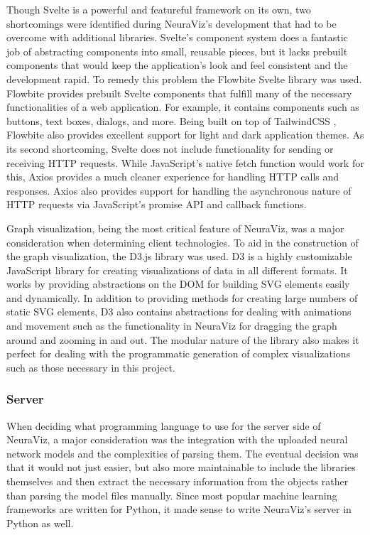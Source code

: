 Though Svelte is a powerful and featureful framework on its own, two shortcomings were identified during NeuraViz's development that had to be overcome with additional libraries. Svelte's component system does a fantastic job of abstracting components into small, reusable pieces, but it lacks prebuilt components that would keep the application's look and feel consistent and the development rapid. To remedy this problem the Flowbite Svelte library \cite{flowbite} was used. Flowbite provides prebuilt Svelte components that fulfill many of the necessary functionalities of a web application. For example, it contains components such as buttons, text boxes, dialogs, and more. Being built on top of TailwindCSS \cite{tailwind}, Flowbite also provides excellent support for light and dark application themes. As its second shortcoming, Svelte does not include functionality for sending or receiving HTTP requests. While JavaScript's native fetch function would work for this, Axios \cite{axios} provides a much cleaner experience for handling HTTP calls and responses. Axios also provides support for handling the asynchronous nature of HTTP requests via JavaScript's promise API and callback functions.

Graph visualization, being the most critical feature of NeuraViz, was a major consideration when determining client technologies. To aid in the construction of the graph visualization, the D3.js library \cite{d3} was used. D3 is a highly customizable JavaScript library for creating visualizations of data in all different formats. It works by providing abstractions on the DOM for building SVG elements easily and dynamically. In addition to providing methods for creating large numbers of static SVG elements, D3 also contains abstractions for dealing with animations and movement such as the functionality in NeuraViz for dragging the graph around and zooming in and out. The modular nature of the library also makes it perfect for dealing with the programmatic generation of complex visualizations such as those necessary in this project.

\subsubsection{Server}
When deciding what programming language to use for the server side of NeuraViz, a major consideration was the integration with the uploaded neural network models and the complexities of parsing them. The eventual decision was that it would not just easier, but also more maintainable to include the libraries themselves and then extract the necessary information from the objects rather than parsing the model files manually. Since most popular machine learning frameworks are written for Python, it made sense to write NeuraViz's server in Python as well. 

